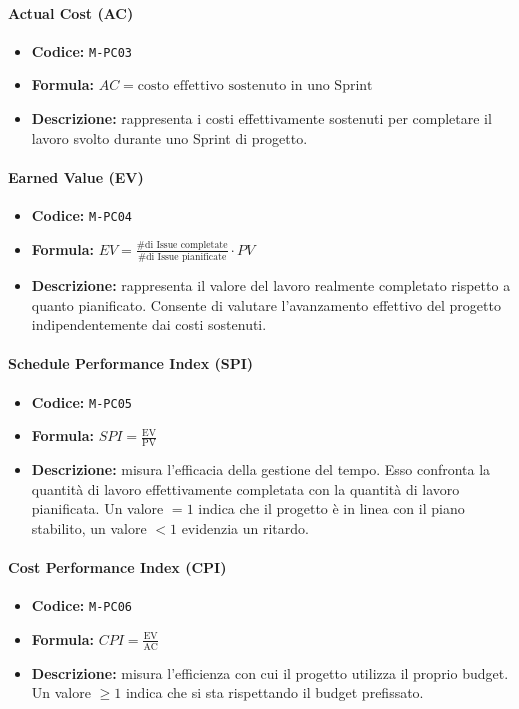 \documentclass[a4paper,12pt]{article}
\begin{document}
\paragraph{Actual Cost (AC)}
\begin{itemize}
    \item \textbf{Codice:} \texttt{M-PC03}
    \item \textbf{Formula:} $AC=\text{costo effettivo sostenuto in uno Sprint}$
    \item \textbf{Descrizione:} rappresenta i costi effettivamente sostenuti per completare il lavoro svolto durante uno Sprint di progetto.
\end{itemize}

\paragraph{Earned Value (EV)}
\begin{itemize}
    \item \textbf{Codice:} \texttt{M-PC04}
    \item \textbf{Formula:} $EV=\frac{\text{\# di Issue completate}}{\text{\# di Issue pianificate}}\cdot PV$
    \item \textbf{Descrizione:} rappresenta il valore del lavoro realmente completato rispetto a quanto pianificato. Consente di valutare l’avanzamento effettivo del progetto indipendentemente dai costi sostenuti.
\end{itemize}

\paragraph{Schedule Performance Index (SPI)}
\begin{itemize}
    \item \textbf{Codice:} \texttt{M-PC05}
    \item \textbf{Formula:} $SPI=\frac{\text{EV}}{\text{PV}}$
    \item \textbf{Descrizione:} misura l'efficacia della gestione del tempo. 
    Esso confronta la quantità di lavoro effettivamente completata con la quantità di lavoro pianificata. Un valore $=1$ indica che il progetto è in linea con il piano stabilito, un valore $<1$ evidenzia un ritardo.
\end{itemize}

\paragraph{Cost Performance Index (CPI)}
\begin{itemize}
    \item \textbf{Codice:} \texttt{M-PC06}
    \item \textbf{Formula:} $CPI=\frac{\text{EV}}{\text{AC}}$
    \item \textbf{Descrizione:} misura l'efficienza con cui il progetto utilizza il proprio budget. Un valore $\geq 1$ indica che si sta rispettando il budget prefissato.
\end{itemize}
\end{document}
